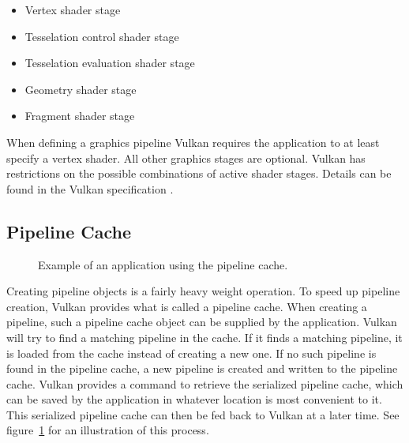     \begin{itemize}
      \item Vertex shader stage
      \item Tesselation control shader stage
      \item Tesselation evaluation shader stage
      \item Geometry shader stage
      \item Fragment shader stage
    \end{itemize}

    When defining a graphics pipeline Vulkan requires the \gls{application} to at least specify a vertex shader. All other graphics stages are optional. Vulkan has restrictions on the possible combinations of active shader stages. Details can be found in the Vulkan specification \cite{vkspec}.


    \subsection{Pipeline Cache}
    \label{subsec:PipelineCache}

      \begin{figure}
        \caption{Example of an \gls{application} using the pipeline cache.}
        \centering
        \label{fig:PipelineCache}
      \end{figure}

      Creating pipeline objects is a fairly heavy weight operation. To speed up pipeline creation, Vulkan provides what is called a pipeline cache. When creating a pipeline, such a pipeline cache object can be supplied by the \gls{application}. Vulkan will try to find a matching pipeline in the cache. If it finds a matching pipeline, it is loaded from the cache instead of creating a new one. If no such pipeline is found in the pipeline cache, a new pipeline is created and written to the pipeline cache. Vulkan provides a command to retrieve the serialized pipeline cache, which can be saved by the \gls{application} in whatever location is most convenient to it. This serialized pipeline cache can then be fed back to Vulkan at a later time. See figure~\ref{fig:PipelineCache} for an illustration of this process.

